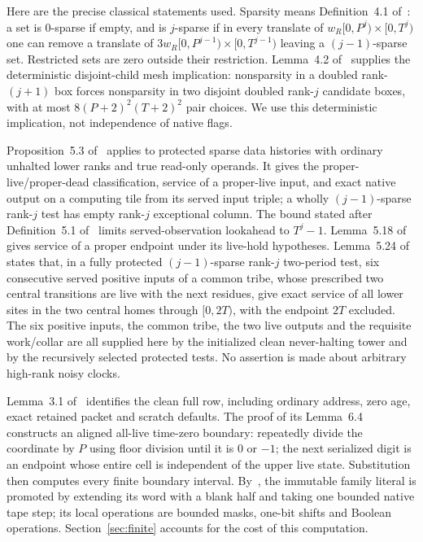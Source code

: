 Here are the precise classical statements used. Sparsity means Definition~4.1 of~\cite{DMNoise1D2026}: a set is $0$-sparse if empty, and is $j$-sparse if in every translate of $w_R[0,P^j)\times[0,T^j)$ one can remove a translate of $3w_R[0,P^{j-1})\times[0,T^{j-1})$ leaving a $(j-1)$-sparse set. Restricted sets are zero outside their restriction. Lemma~4.2 of~\cite{DMNoise1D2026} supplies the deterministic disjoint-child mesh implication: nonsparsity in a doubled rank-$(j+1)$ box forces nonsparsity in two disjoint doubled rank-$j$ candidate boxes, with at most $8(P+2)^2(T+2)^2$ pair choices. We use this deterministic implication, not independence of native flags.

Proposition~5.3 of~\cite{DMNoise1D2026} applies to protected sparse data histories with ordinary unhalted lower ranks and true read-only operands. It gives the proper-live/proper-dead classification, service of a proper-live input, and exact native output on a computing tile from its served input triple; a wholly $(j-1)$-sparse rank-$j$ test has empty rank-$j$ exceptional column. The bound stated after Definition~5.1 of~\cite{DMNoise1D2026} limits served-observation lookahead to $T^j-1$. Lemma~5.18 of~\cite{DMNoise1D2026} gives service of a proper endpoint under its live-hold hypotheses. Lemma~5.24 of~\cite{DMNoise1D2026} states that, in a fully protected $(j-1)$-sparse rank-$j$ two-period test, six consecutive served positive inputs of a common tribe, whose prescribed two central transitions are live with the next residues, give exact service of all lower sites in the two central homes through $[0,2T)$, with the endpoint $2T$ excluded. The six positive inputs, the common tribe, the two live outputs and the requisite work/collar are all supplied here by the initialized clean never-halting tower and by the recursively selected protected tests. No assertion is made about arbitrary high-rank noisy clocks.

Lemma~3.1 of~\cite{DMNoise1D2026} identifies the clean full row, including ordinary address, zero age, exact retained packet and scratch defaults. The proof of its Lemma~6.4 constructs an aligned all-live time-zero boundary: repeatedly divide the coordinate by $P$ using floor division until it is $0$ or $-1$; the next serialized digit is an endpoint whose entire cell is independent of the upper live state. Substitution then computes every finite boundary interval. By~\cite[Section~3.5]{DMNoise1D2026}, the immutable family literal is promoted by extending its word with a blank half and taking one bounded native tape step; its local operations are bounded masks, one-bit shifts and Boolean operations. Section~\ref{sec:finite} accounts for the cost of this computation.

